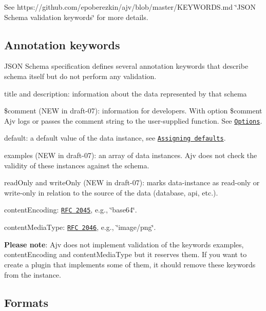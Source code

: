 See https\+://github.com/epoberezkin/ajv/blob/master/\+K\+E\+Y\+W\+O\+R\+D\+S.\+md \char`\"{}\+J\+S\+O\+N Schema validation keywords\char`\"{} for more details.

\subsection*{Annotation keywords}

J\+S\+ON Schema specification defines several annotation keywords that describe schema itself but do not perform any validation.


\begin{DoxyItemize}
\item {\ttfamily title} and {\ttfamily description}\+: information about the data represented by that schema
\item {\ttfamily \$comment} (N\+EW in draft-\/07)\+: information for developers. With option {\ttfamily \$comment} Ajv logs or passes the comment string to the user-\/supplied function. See \href{#options}{\tt Options}.
\item {\ttfamily default}\+: a default value of the data instance, see \href{#assigning-defaults}{\tt Assigning defaults}.
\item {\ttfamily examples} (N\+EW in draft-\/07)\+: an array of data instances. Ajv does not check the validity of these instances against the schema.
\item {\ttfamily read\+Only} and {\ttfamily write\+Only} (N\+EW in draft-\/07)\+: marks data-\/instance as read-\/only or write-\/only in relation to the source of the data (database, api, etc.).
\item {\ttfamily content\+Encoding}\+: \href{https://tools.ietf.org/html/rfc2045#section-6.1}{\tt R\+FC 2045}, e.\+g., \char`\"{}base64\char`\"{}.
\item {\ttfamily content\+Media\+Type}\+: \href{https://tools.ietf.org/html/rfc2046}{\tt R\+FC 2046}, e.\+g., \char`\"{}image/png\char`\"{}.
\end{DoxyItemize}

{\bfseries Please note}\+: Ajv does not implement validation of the keywords {\ttfamily examples}, {\ttfamily content\+Encoding} and {\ttfamily content\+Media\+Type} but it reserves them. If you want to create a plugin that implements some of them, it should remove these keywords from the instance.

\subsection*{Formats}

